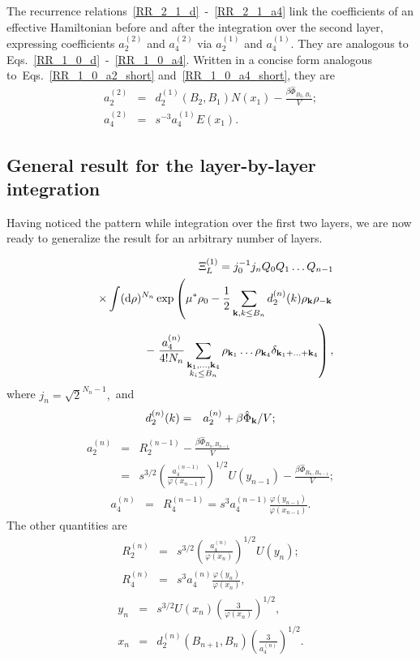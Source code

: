 The recurrence relations~\eqref{RR_2_1_d}~-~\eqref{RR_2_1_a4} link the coefficients of an effective Hamiltonian before and after the integration over the second layer, expressing coefficients $a_2^{(2)}$ and $a_4^{(2)}$ via $a_2^{(1)}$ and $a_4^{(1)}$. They are analogous to Eqs.~\eqref{RR_1_0_d}~-~\eqref{RR_1_0_a4}. Written in a concise form analogous to~Eqs.~\eqref{RR_1_0_a2_short} and~\eqref{RR_1_0_a4_short}, they are
\begin{eqnarray}
	a_2^{(2)} & = & d_2^{(1)}(B_2, B_1) N(x_1) - \frac{\beta\hat{\Phi}_{B_2, B_1}}{V};
	\\
	a_4^{(2)} & = & s^{-3} a_4^{(1)} E(x_1).
\end{eqnarray}

\subsection{General result for the layer-by-layer integration}
Having noticed the pattern while integration over the first two layers, we are now ready to generalize the result for an arbitrary number of layers.

\begin{eqnarray}
	&&\Xi_L^{(1)} = j_0^{-1}j_n Q_0 Q_1 \dotsc Q_{n-1} 
	\\
	&&\times 
	\int ({\rm d} \rho)^{N_n} \exp
	\left(
	\mu^*\rho_0 - \frac{1}{2} \sum_{\vb k, k \leq B_n} d_2^{(n)}(k) \rho_{\vb k} \rho_{-\vb k}
	\right.
	\nonumber \\
	&&- 
	\left.
	\frac{a_4^{(n)}}{4!N_n} \sum_{\substack{\vb k_1, \dotsc, \vb k_4 \\ k_i \leq B_n}}
	\rho_{\vb k_1} \dotsc \rho_{\vb k_4} \delta_{\vb{k}_1 + \dotsc + \vb{k}_4}
	\right)
	\nonumber ,
\end{eqnarray}
where $j_n = \sqrt{2}^{N_n - 1},$ and
\begin{eqnarray}
	\label{RR_n_d}
	d_2^{(n)}(k) & = & a_2^{(n)} + \beta\hat{\Phi}_{\vb k} / V;
\end{eqnarray}
\begin{eqnarray}
	\label{RR_n_a2}
	a_2^{(n)} & = & R_2^{(n-1)} - \frac{\beta\hat{\Phi}_{B_n, B_{n-1}}}{V}
	\\
	& = &  s^{3/2} \left(\frac{a_4^{(n-1)}}{\varphi(x_{n-1})}\right)^{1/2} U(y_{n-1})
	- \frac{\beta\hat{\Phi}_{B_n, B_{n-1}}}{V};
	\nonumber
\end{eqnarray}
\begin{eqnarray}
	\label{RR_n_a4}
	a_4^{(n)} & = & R_4^{(n-1)} = s^3 a_4^{(n-1)} \frac{\varphi(y_{n-1})}{\varphi(x_{n-1})}.
\end{eqnarray}
The other quantities are
\begin{eqnarray*}
	R_2^{(n)} & = & s^{3/2} \left(\frac{a_4^{(n)}}{\varphi(x_n)}\right)^{1/2} U(y_n);
\\
	R_4^{(n)} & = & s^3 a_4^{(n)} \frac{\varphi(y_n)}{\varphi(x_n)},
\end{eqnarray*}
\begin{eqnarray*}
	y_n & = & s^{3/2} U(x_n) \left(\frac{3}{\varphi(x_n)}\right)^{1/2},
\\
	x_n & = & d_2^{(n)}(B_{n+1}, B_n) \left(\frac{3}{a_4^{(n)}}\right)^{1/2}.
\end{eqnarray*}

